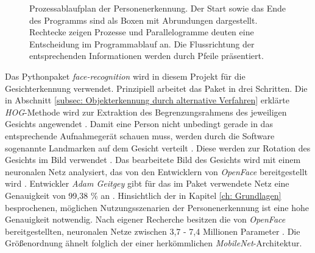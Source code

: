 \begin{figure}[H]
			\caption{Prozessablaufplan der Personenerkennung. Der Start sowie das Ende des Programms sind als Boxen mit Abrundungen dargestellt. Rechtecke zeigen Prozesse und Parallelogramme deuten eine Entscheidung im Programmablauf an. Die Flussrichtung der entsprechenden Informationen werden durch Pfeile präsentiert.}
			\label{fig: Personenerkennung}
		\end{figure}
		\newpage
		
	Das Pythonpaket \textit{face-recognition} wird in diesem Projekt für die Gesichterkennung verwendet. Prinzipiell arbeitet das Paket in drei Schritten. Die in Abschnitt \ref{subsec: Objekterkennung durch alternative Verfahren} erklärte \textit{HOG}-Methode wird zur Extraktion des Begrenzungsrahmens des jeweiligen Gesichts angewendet \cite{facerecarticle}. Damit eine Person nicht unbedingt gerade in das entsprechende Aufnahmegerät schauen muss, werden durch die Software sogenannte Landmarken auf dem Gesicht verteilt \cite{facerecarticle}. Diese werden zur Rotation des Gesichts im Bild verwendet \cite{facerecarticle}. Das bearbeitete Bild des Gesichts wird mit einem neuronalen Netz analysiert, das von den Entwicklern von \textit{OpenFace} bereitgestellt wird \cite{facerecarticle}. Entwickler \textit{Adam Geitgey} gibt für das im Paket verwendete Netz eine Genauigkeit von 99,38 \% an \cite{facerecognition}. Hinsichtlich der in Kapitel \ref{ch: Grundlagen} besprochenen, möglichen Nutzungsszenarien der Personenerkennung ist eine hohe Genauigkeit notwendig. Nach eigener Recherche besitzen die von \textit{OpenFace} bereitgestellten, neuronalen Netze zwischen 3,7 - 7,4 Millionen Parameter \cite{openface}. Die Größenordnung ähnelt folglich der einer herkömmlichen \textit{MobileNet}-Architektur.\\
	
